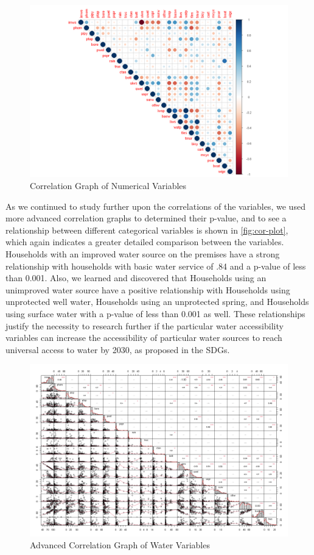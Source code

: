 \documentclass[10pt,twoside]{article}
\numberwithin{equation}{section}
\newcommand{\?}{\stackrel{?}{=}}
\begin{document}
\begin{figure}[h!]
  \centering
  \includegraphics[width=.7\textwidth]{correlation-basic}
  \caption{Correlation Graph of Numerical Variables}
  \label{fig:cor-basic}
\end{figure}
As we continued to study further upon the correlations of the variables, we used more advanced correlation graphs to determined their p-value, and to see a relationship between different categorical variables is shown in \autoref{fig:cor-plot}, which again indicates a greater detailed comparison between the variables. Households with an improved water source on the premises have a strong relationship with households with basic water service of .84 and a p-value of less than 0.001. Also, we learned and discovered that Households using an unimproved water source have a positive relationship with Households using unprotected well water, Households using an unprotected spring, and Households using surface water with a p-value of less than 0.001 as well. These relationships justify the necessity to research further if the particular water accessibility variables can increase the accessibility of particular water sources to reach universal access to water by 2030, as proposed in the SDGs. 



\begin{figure}[h!]
  \centering
  \includegraphics[width=.7\textwidth]{adv-cor-plot}
  \caption{Advanced Correlation Graph of Water Variables}
  \label{fig:cor-plot}
\end{figure}
\end{document}

